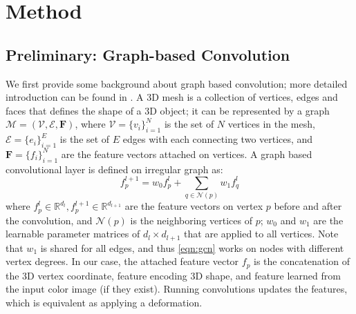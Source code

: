 \documentclass[runningheads]{llncs}
\def\bfF{\mathbf{F}}
\def\calE{\mathcal{E}}
\def\calM{\mathcal{M}}
\def\calN{\mathcal{N}}
\def\calV{\mathcal{V}}
\def\bbR{\mathbb{R}}
\begin{document}
\section{Method}

\subsection{Preliminary: Graph-based Convolution}
We first provide some background about graph based convolution; more detailed introduction can be found in \cite{BronsteinBLSV17}.
A 3D mesh is a collection of vertices, edges and faces that defines the shape of a 3D object; it can be represented by a graph $\calM=(\calV, \calE, \bfF)$, where $\calV=\{v_i\}^{N}_{i=1}$ is the set of $N$ vertices in the mesh, $\calE=\{e_i\}^{E}_{i=1}$ is the set of $E$ edges with each connecting two vertices, and $\bfF=\{f_i\}^{N}_{i=1}$ are the feature vectors attached on vertices.
A graph based convolutional layer is defined on irregular graph as: 
\begin{equation}
f_p^{l+1}= w_0 f_p^l + \sum_{q\in \calN(p)} w_1 f_q^l
\label{eqn:gcn}
\end{equation}
where $f_p^l\in\bbR^{d_l}, f_p^{l+1}\in\bbR^{d_{l+1}}$ are the feature vectors on vertex $p$ before and after the convolution, and $\calN(p)$ is the neighboring vertices of $p$; $w_0$ and $w_1$ are the learnable parameter matrices of $d_l\times d_{l+1}$ that are applied to all vertices. Note that $w_1$ is shared for all edges, and thus \eqref{eqn:gcn} works on nodes with different vertex degrees.
In our case, the attached feature vector $f_p$ is the concatenation of the 3D vertex coordinate, feature encoding 3D shape, and feature learned from the input color image (if they exist).
Running convolutions updates the features, which is equivalent as applying a deformation.
\end{document}
